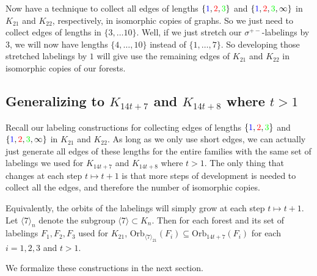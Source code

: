   Now have a technique to collect all edges of lengths $\{\textcolor{blue}{1},\textcolor{red}{2},\textcolor{green}{3}\}$ and $\{\textcolor{blue}{1},\textcolor{red}{2},\textcolor{green}{3},\infty\}$ in $K_{21}$ and $K_{22}$, respectively, in isomorphic copies of graphs. So we just need to collect edges of lengths in $\{3,\hdots 10\}$. Well, if we just stretch our $\sigma^{+-}$-labelings by $3$, we will now have lengths $\{4,\hdots,10\}$ instead of $\{1,\hdots,7\}$. So developing those stretched labelings by $1$ will give use the remaining edges of $K_{21}$ and $K_{22}$ in isomorphic copies of our forests.
  \subsection{Generalizing to $K_{14t+7}$ and $K_{14t+8}$ where $t>1$}\label{sec:7,8constrgen}

  Recall our labeling constructions for collecting edges of lengths $\{\textcolor{blue}{1},\textcolor{red}{2},\textcolor{green}{3}\}$ and $\{\textcolor{blue}{1},\textcolor{red}{2},\textcolor{green}{3},\infty\}$ in $K_{21}$ and $K_{22}$. As long as we only use short edges, we can actually just generate all edges of these lengths for the entire families with the same set of labelings we used for $K_{14t+7}$ and $K_{14t+8}$ where $t>1$. The only thing that changes at each step $t\mapsto t+1$ is that more steps of development is needed to collect all the edges, and therefore the number of isomorphic copies.
  
  Equivalently, the orbits of the labelings will simply grow at each step $t\mapsto t+1$. Let $\langle 7\rangle_{n}$ denote the subgroup $\langle 7\rangle\subset K_{n}$. Then for each forest and its set of labelings $F_{1},F_{2},F_{3}$ used for $K_{21}$, $\mathrm{Orb}_{\langle 7\rangle_{21}}(F_{i})\subseteq \mathrm{Orb}_{14t+7}(F_{i})$ for each $i=1,2,3$ and $t>1$.\newline

 We formalize these constructions in the next section.
